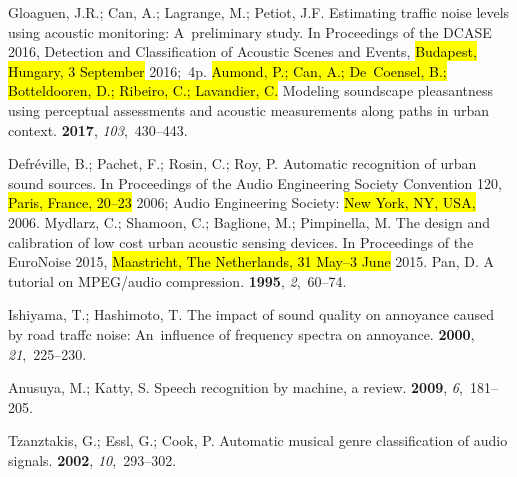 \documentclass[sensors,article,accept,moreauthors,pdftex,10pt,a4paper]{mdpi}
\DeclareRobustCommand{\fg}[1]{{\sethlcolor{cyan}\hl{#1}}}
\begin{document}
\begin{thebibliography}{999}
Gloaguen, J.R.; Can, A.; Lagrange, M.; Petiot, J.F.
\newblock Estimating traffic noise levels using acoustic monitoring: A~preliminary study.
\newblock  In Proceedings of the DCASE 2016, Detection and Classification of Acoustic Scenes and
  Events, \hl{Budapest, Hungary, 3  September} 2016;~4p.
\hl{Aumond, P.; Can, A.; De~Coensel, B.; Botteldooren, D.; Ribeiro, C.; Lavandier,
  C.}
\newblock Modeling soundscape pleasantness using perceptual assessments and
  acoustic measurements along paths in urban context.
 {\bf 2017}, {\em
  103},~430--443.

Defr{\'e}ville, B.; Pachet, F.; Rosin, C.; Roy, P.
\newblock Automatic recognition of urban sound sources.
\newblock  In Proceedings of the Audio Engineering Society Convention 120, \fg{Paris, France, 20--23} 2006;   Audio Engineering Society: \hl{New York, NY, USA,}  2006.
Mydlarz, C.; Shamoon, C.; Baglione, M.; Pimpinella, M.
\newblock The design and calibration of low cost urban acoustic sensing
  devices.
\newblock  In Proceedings of the EuroNoise 2015, \hl{Maastricht, The Netherlands, 31 May--3 June} 2015.
Pan, D.
\newblock A tutorial on MPEG/audio compression.
 {\bf 1995}, {\em 2},~60--74.

Ishiyama, T.; Hashimoto, T.
\newblock The impact of sound quality on annoyance caused by road traffc noise:
  An~influence of frequency spectra on annoyance.
 {\bf 2000}, {\em 21},~225--230.

Anusuya, M.; Katty, S.
\newblock Speech recognition by machine, a review.
 {\bf 2009}, {\em 6},~181--205.

Tzanztakis, G.; Essl, G.; Cook, P.
\newblock Automatic musical genre classification of audio signals.
 {\bf 2002},
  {\em 10},~293--302.


\end{thebibliography}
\end{document}
